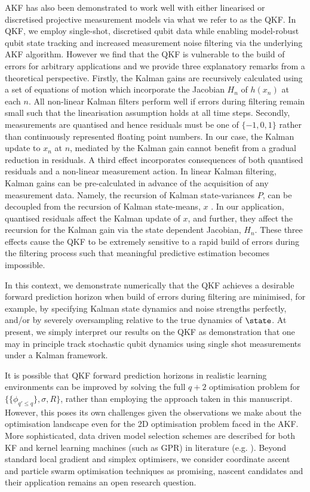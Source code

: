 {AKF has also been demonstrated to work well with either linearised or discretised projective measurement models via what we refer to as the QKF.  In QKF, we employ single-shot, discretised qubit data while enabling model-robust qubit state tracking and increased measurement noise filtering via the underlying AKF algorithm.  However we find that the QKF is vulnerable to the build of errors for arbitrary applications and we provide three explanatory remarks from a theoretical perspective. Firstly, the Kalman gains are recursively calculated using a set of  equations of motion which incorporate the Jacobian $H_n$ of $h(x_n)$ at each $n$. All non-linear Kalman filters perform well if errors during filtering remain small such that the linearisation assumption holds at all time steps. Secondly, measurements are quantised and hence residuals must be one of $\{-1, 0, 1 \}$ rather than continuously represented floating point numbers.  In our case, the Kalman update to $x_n$ at $n$, mediated by the Kalman gain cannot benefit from a gradual reduction in residuals.  A third effect incorporates consequences of both quantised residuals and a non-linear measurement action. In linear Kalman filtering, Kalman gains can be pre-calculated in advance of the acquisition of any measurement data. Namely, the recursion of Kalman state-variances $P$, can be decoupled from the recursion of Kalman state-means, $x$ \cite{grewal2001theory}.  In our application, quantised residuals affect the Kalman update of $x$, and further, they affect the recursion for the Kalman gain via the state dependent Jacobian, $H_n$. These three effects cause the QKF to be extremely sensitive to a rapid build of errors during the filtering process such that meaningful predictive estimation becomes impossible.

In this context, we demonstrate numerically that the QKF achieves a desirable forward prediction horizon when build of errors during filtering are minimised, for example, by specifying Kalman state dynamics and noise strengths perfectly, and/or by severely oversampling relative to the true dynamics of $\state$.   At present, we simply interpret our results on the QKF as demonstration that one may in principle track stochastic qubit dynamics using single shot measurements under a Kalman framework.

 It is possible that QKF forward prediction horizons in realistic learning environments can be improved by solving the full $q+2$ optimisation problem for $\{\{ \phi_{q' \leq q}\}, \sigma, R\}$, rather than employing the approach taken in this manuscript. However, this poses its own challenges given the observations we make about the optimisation landscape even for the 2D optimisation problem faced in the AKF.  More sophisticated, data driven model selection schemes are described for both KF and kernel learning machines (such as GPR) in literature (e.g. \cite{arlot2009data, vu2015understanding}). Beyond standard local gradient and simplex optimisers, we consider coordinate ascent \cite{abbeel2005} and particle swarm optimisation techniques \cite{robertson2017particle} as promising, nascent candidates and their application remains an open research question. 

}
